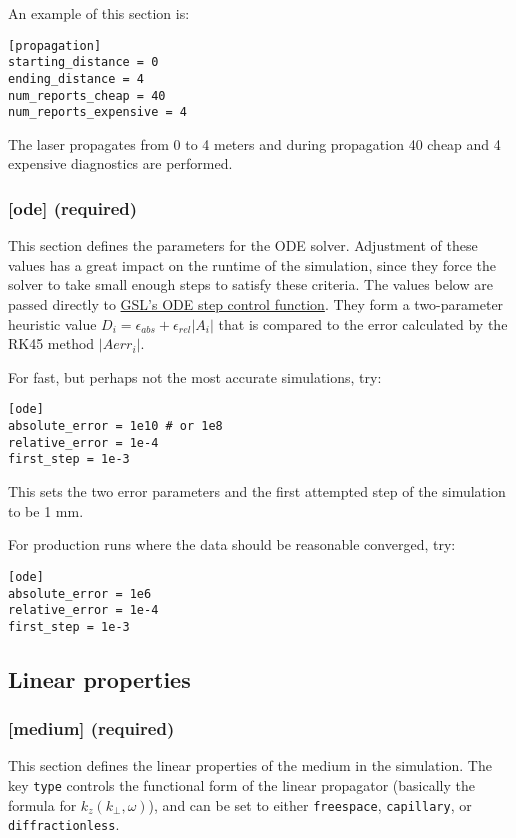 \documentclass{article}
\begin{document}
An example of this section is:
\begin{lstlisting}
[propagation]
starting_distance = 0
ending_distance = 4
num_reports_cheap = 40
num_reports_expensive = 4
\end{lstlisting}

The laser propagates from 0 to 4 meters and during propagation 40
cheap and 4 expensive diagnostics are performed.

\subsubsection{[ode] (required)}
This section defines the parameters for the ODE solver. Adjustment of
these values has a great impact on the runtime of the simulation,
since they force the solver to take small enough steps to satisfy
these criteria. The values below are passed directly to
\href{https://www.gnu.org/software/gsl/doc/html/ode-initval.html\#c.gsl\_odeiv2\_control\_standard\_new}{GSL's
  ODE step control function}. They form a two-parameter heuristic
value $D_i= \epsilon_{abs} + \epsilon_{rel} |A_i|$ that is compared to
the error calculated by the RK45 method $|Aerr_i|$.

For fast, but perhaps not the most accurate simulations, try:
\begin{lstlisting}
[ode]
absolute_error = 1e10 # or 1e8
relative_error = 1e-4
first_step = 1e-3
\end{lstlisting}
This sets the two error parameters and the first attempted step of the
simulation to be 1 mm.


For production runs where the data should be reasonable converged,
try:
\begin{lstlisting}
[ode]
absolute_error = 1e6
relative_error = 1e-4
first_step = 1e-3
\end{lstlisting}


\subsection{Linear properties}
\subsubsection{[medium] (required)}
\label{sec:medium}
This section defines the linear properties of the medium in the
simulation. The key \texttt{type} controls the functional form of the
linear propagator (basically the formula for $k_z(k_\perp, \omega)$),
and can be set to either \texttt{freespace}, \texttt{capillary}, or
\texttt{diffractionless}.
\end{document}
